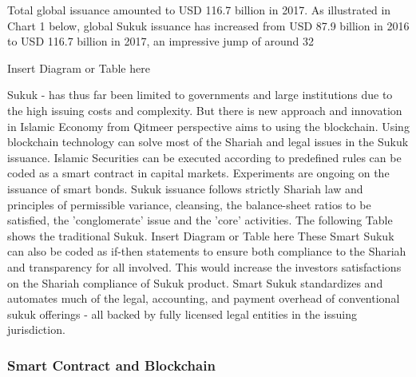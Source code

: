 \documentclass[a4paper,11pt]{article}
\begin{document}
Total global issuance amounted to USD 116.7 billion in 2017. As illustrated in Chart 1 below, global Sukuk issuance has increased from USD 87.9 billion in 2016 to USD 116.7 billion in 2017, an impressive jump of around 32%

                                              Insert Diagram or Table here

Sukuk - has thus far been limited to governments and large institutions due to the high issuing costs and complexity. But there is new approach and innovation in Islamic Economy from Qitmeer perspective aims to using the blockchain. Using blockchain technology can solve most of the Shariah and legal  issues in the Sukuk issuance. Islamic Securities can be executed according to predefined rules can be coded as a smart contract in capital markets. 
Experiments are ongoing on the issuance of smart bonds. Sukuk issuance follows strictly Shariah law and principles of permissible variance, cleansing, the balance-sheet ratios to be satisfied, the 'conglomerate' issue and the 'core' activities. The following Table shows the traditional Sukuk.
Insert Diagram or Table here
These Smart Sukuk can also be coded as if-then statements to ensure both compliance to the Shariah and transparency for all involved. This would increase the investors satisfactions on the Shariah compliance of Sukuk product.
Smart Sukuk standardizes and automates much of the legal, accounting, and payment overhead of conventional sukuk offerings - all backed by fully licensed legal entities in the issuing jurisdiction.

\subsubsection{Smart Contract and Blockchain}
\end{document}
